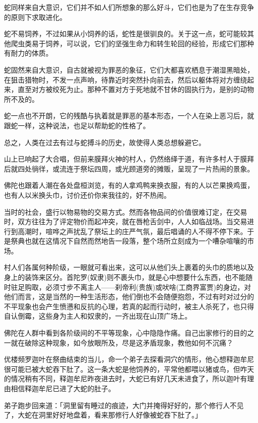 \documentclass[twoside,openany]{book}
\begin{document}
蛇同样来自大意识，它们并不如人们所想象的那么好斗，它们也是为了在生存竞争的原则下求取进化。

蛇不易饲养，不过如果从小饲养的话，蛇性是很驯良的。关于这一点，蛇可能较其他爬虫类易于饲养，可以说，它们的坚强生命力和转生轮回的经验，形成它们那种有耐力的体质。

蛇固然来自大意识，自古就被视为罪恶的象征，它们大都喜欢栖息于潮湿黑暗处，在狙击猎物时，不发一点声响，待靠近时突然扑向前去，然后以躯体将对方缠绕起来，直至对方被绞死为止。那种不置对方于死地就不甘休的固执行为，是别的动物所不及的。

蛇一点也不开朗，它的残酷与执着就是罪恶的基本形态，一个人在染上恶习后，就跟蛇一样，这种说法，也足以帮助蛇的性格了。

总之，人类在过去有过与蛇搏斗的历史，故使得人类总想躲避它。

山上已响起了大合唱，但前来膜拜火神的村人，仍然络绎于道，有许多村人于膜拜后就四处徜徉，或流连于祭坛四周，或光顾道旁的摊贩，呈现了一片热闹的景象。

佛陀也跟着人潮在各处盘桓浏览，有的人拿鸡鸭来换衣服，有的人以芒果换鸡蛋，也有人以米换头巾，讨价还价你来我往的，好不热闹。

当时的社会，盛行以物易物的交易方式。然而各物品间的价值很难订定，在交易时，双方往往为了评定物价而起冲突，就在唇枪舌剑中，人人如临战场。当交易进行到高潮时，喧哗之声扰乱了祭坛上的庄严气氛，最后唱诵的人不得不停下来。于是祭典也就在这情况下自然而然地告一段落，整个场所立刻成为一个嘈杂喧嚷的市场。

村人们各属何种阶级，一眼就可看出来，这可以从他们头上裹着的头巾的质地以及身上的装饰来区分。首陀罗(奴隶)则不裹头巾，就是心中想要什么东西，也不能随时驻足购取，必须寸步不离主人——刹帝利(贵族)或吠啥(工商界富贾)的身边，对他们而言，这是当然的一种生活形态，他们倒也不会随便抱怨，不过有时对过分的不平现象也会产生愤懑和反抗的心理，若真的起而行动时，被主人杀死了，也只得自认倒霉，这些身为主人和奴隶的，一齐出现在山顶广场上。

佛陀在人群中看到各阶级间的不平等现象，心中隐隐作痛。自己出家修行的目的之一就在破除这种现象，如今放眼所及，尽是这矛盾现象，教他如何不沉痛？

优楼频罗迦叶在祭曲结束的当儿，命一个弟子去探看洞穴的情形，他心想释迦牟尼很可能已被大蛇吞下肚了。这一条大蛇是他饲养的，平常他都喂以猪或鸟，但咋天的情况稍有不同，释迦牟尼昨夜进去时，大蛇已有好几天未进食了，所以迦叶有理由相信释迦牟尼已进了大蛇的肚子。

弟子跑步回来道：「洞里留有睡过的痕迹，大门并掩得好好的，那个修行人不见了，大蛇在洞里好好地盘着，看来那修行人好像被蛇吞下肚了。」
\end{document}
